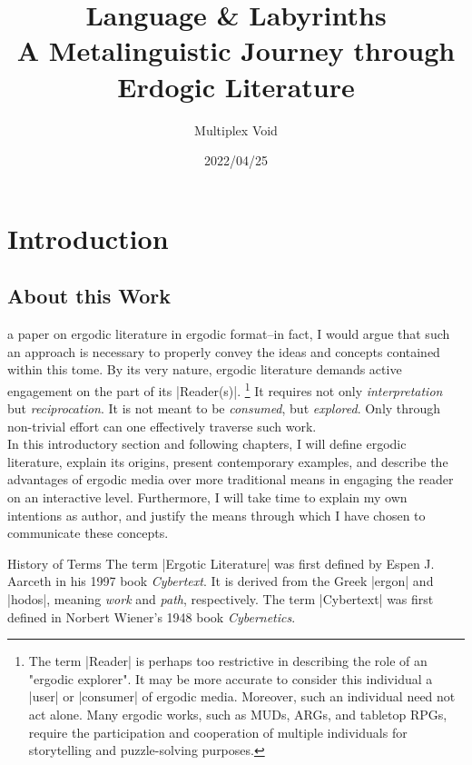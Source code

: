 \documentclass[10pt,twoside,twocolumn,openany,nomultitoc]{book}
\title{Language \& Labyrinths\\{%
\large A Metalinguistic Journey through Erdogic Literature}}
\author{Multiplex Void}
\date{2022/04/25}
\begin{document}
\frontmatter
\maketitle
\tableofcontents
\mainmatter

\part{Introduction}   %
\chapter{About this Work}

 a paper on ergodic literature in ergodic format--in fact, I would argue that such an approach is necessary to properly convey the ideas and concepts contained within this tome. By its very nature, ergodic literature demands active engagement on the part of its 
|Reader(s)|.
    \footnote{The term |Reader| is perhaps too restrictive in describing the role of an "ergodic explorer". It may be more accurate to consider this individual a |user| or |consumer| of ergodic media. Moreover, such  an individual need not act alone. Many ergodic works, such as MUDs, ARGs, and tabletop RPGs, require the participation and cooperation of multiple individuals for storytelling and puzzle-solving purposes.}         
It requires not only \textit{interpretation} but \textit{reciprocation}. It is not meant to be \textit{consumed}, but \textit{explored}. Only through non-trivial effort can one effectively traverse such work. \\ 

    In this introductory section and following chapters, I will define ergodic literature, explain its origins, present contemporary examples, and describe the advantages of ergodic media over more traditional means in engaging the reader on an interactive level. Furthermore, I will take time to explain my own intentions as author, and justify the means through which I have chosen to communicate these concepts.

\begin{DndSidebar}[]{History of Terms}
  The term |Ergotic Literature| was first defined by Espen J. Aarceth in his 1997 book \textit{Cybertext}. It is derived from the Greek |ergon| and |hodos|, meaning \textit{work} and \textit{path}, respectively. The term |Cybertext| was first defined in Norbert Wiener's 1948 book \textit{Cybernetics}.
\end{DndSidebar}
    
\end{document}
